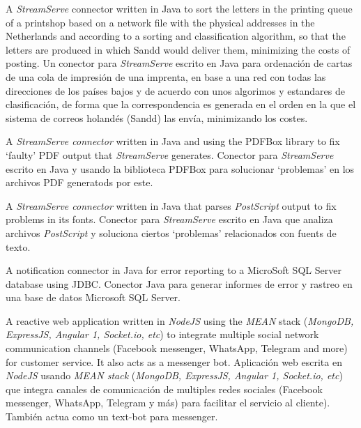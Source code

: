     {\ml
    {A \textit{StreamServe} connector written in Java to sort the letters in the
    printing queue of a printshop based on a network file with the physical
    addresses in the Netherlands and according to a sorting and classification
    algorithm, so that the letters are produced in which Sandd would deliver
    them, minimizing the costs of posting.}
    {Un conector para \textit{StreamServe} escrito en Java para ordenación de
    cartas de una cola de impresión de una imprenta, en base a una red con
    todas las direcciones de los países bajos y de acuerdo con unos algorimos y
    estandares de clasificación, de forma que la correspondencia es generada en
    el orden en la que el sistema de correos holandés (Sandd) las envía,
    minimizando los costes.}
}


    {\ml
    {A \textit{StreamServe connector} written in Java and using the PDFBox
    library to fix `faulty' PDF output that \textit{StreamServe} generates.}
    {Conector para \textit{StreamServe} escrito en Java y usando la biblioteca
    PDFBox para solucionar `problemas' en los archivos PDF generatods por
    este.}
}


    {\ml
    {A \textit{StreamServe connector} written in Java that parses
    \textit{PostScript} output to fix problems in its fonts.}
    {Conector para \textit{StreamServe} escrito en Java que analiza archivos
    \textit{PostScript} y soluciona ciertos `problemas' relacionados con fuents
    de texto.}
}


    {\ml
    {A notification connector in Java for error reporting to a MicroSoft SQL
    Server database using JDBC.}
    {Conector Java para generar informes de error y rastreo en una base de
    datos Microsoft SQL Server.}
}


    {\ml
    {A reactive web application written in \textit{NodeJS} using the
    \textit{MEAN} stack (\textit{MongoDB, ExpressJS, Angular 1, Socket.io,
    etc}) to integrate multiple social network communication channels (Facebook
    messenger, WhatsApp, Telegram and more) for customer service. It also acts
    as a messenger bot.}
    {Aplicación web escrita en \textit{NodeJS} usando \textit{MEAN stack}
    (\textit{MongoDB, ExpressJS, Angular 1, Socket.io, etc}) que integra
    canales de comunicación de multiples redes sociales (Facebook messenger,
    WhatsApp, Telegram y más) para facilitar el servicio al cliente). También
    actua como un text-bot para messenger.}
}


